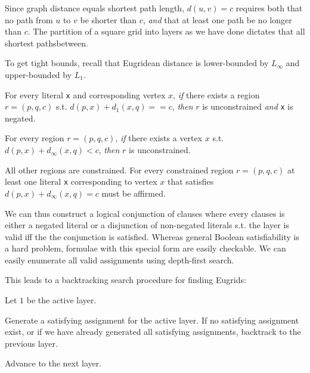 \documentclass[letterpaper]{article}
\begin{document}
Since graph distance equals shortest path length, $d(u, v) = c$ requires both that no path
from $u$ to $v$ be shorter than $c$, \emph{and} that at least one path be no longer than $c$.
The partition of a square grid into layers as we have done dictates that all shortest pathsbetween.

To get tight bounds, recall that Eugridean distance is lower-bounded by $L_\infty$ and
upper-bounded by $L_1$.

For every literal \verb|x| and corresponding vertex $x$, \emph{if} there exists a region
$r = (p, q, c)$ s.t. $d(p, x) + d_1(x, q) == c$, \emph{then} $r$ is unconstrained \emph{and}
\verb|x| is negated.

For every region $r = (p, q, c)$, \emph{if} there exists a vertex $x$ s.t.
$d(p, x) + d_{\infty}(x, q) < c$, \emph{then} $r$ is unconstrained.

All other regions are constrained. For every constrained region $r = (p, q, c)$ at least one
literal \verb|x| corresponding to vertex $x$ that satisfies $d(p, x) + d_{\infty}(x, q) = c$
must be affirmed.

We can thus construct a logical conjunction of clauses where every clauses is either a
negated literal or a disjunction of non-negated literals s.t. the layer is valid iff the the
conjunction is satisfied. Whereas general Boolean satisfiability is a hard problem, formulae
with this special form are easily checkable. We can easily enumerate all valid assignments
using depth-first search.

This leads to a backtracking search procedure for finding Eugrids:

Let $1$ be the active layer.

Generate a satisfying assignment for the active layer. If no satisfying assignment exist, or
if we have already generated all satisfying assignments, backtrack to the previous layer.

Advance to the next layer.
\end{document}
